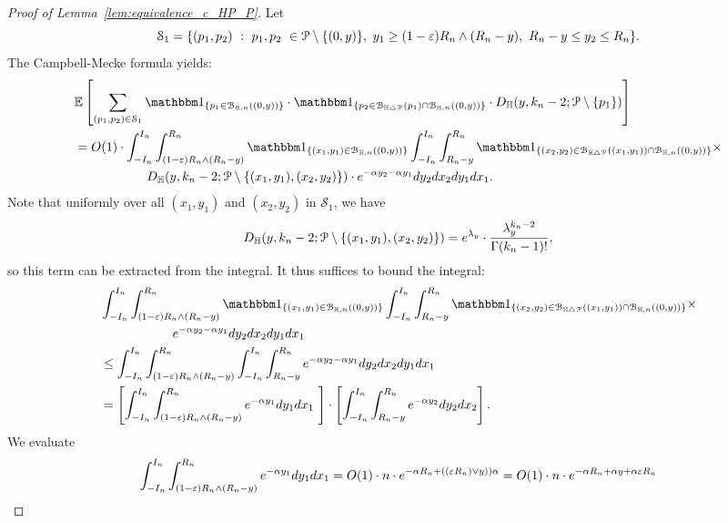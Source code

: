 \begin{proof}[Proof of Lemma~\ref{lem:equivalence_c_HP_P}]
Let 
$$\mathcal{S}_1 = \{(p_1, p_2) \ : \  p_1,p_2 \ \in \Pcal \setminus \{(0,y) \}, \ y_1 \geq (1-\eps) R_n \wedge (R_n-y), \ 
R_n -y \leq y_2 \leq R_n \}. $$
The Campbell-Mecke formula yields: 
\begin{equation*}
\begin{split} 
&\Exp { \sum_{(p_1,p_2)  \in \mathcal{S}_1} 
\ind{p_1 \in \BallHyp{(0,y)}} \cdot \ind{p_2 \in \BallSym{p_1} \cap \BallHyp{(0,y)}}
\cdot D_\H (y,k_n-2;\Pcal \setminus \{ p_1\})} \\
& 
=O(1) \cdot \int_{-I_n}^{I_n} \int_{(1-\eps) R_n \wedge (R_n-y)}^{R_n} \ind{(x_1,y_1) \in \BallHyp{(0,y)}}
\int_{-I_n}^{I_n} \int_{R_n - y}^{R_n} 
\ind{(x_2,y_2) \in \BallSym{(x_1,y_1)} \cap \BallHyp{(0,y)}} \times \\ 
& \hspace{2cm}  D_\H (y,k_n-2;\Pcal \setminus \{ (x_1,y_1), (x_2,y_2)\}) \cdot
e^{-\alpha y_2 - \alpha y_1} dy_2 dx_2 dy_1 dx_1.
\end{split}
\end{equation*}
Note that uniformly over all $(x_1,y_1)$ and $(x_2,y_2)$ in $\mathcal{S}_1$, we have 
$$ D_{\mathbb{H}} (y,k_n-2;{\mathcal P} \setminus \{ (x_1,y_1), (x_2,y_2)\})   = e^{\lambda_y} \cdot \frac{\lambda_y^{k_n-2}}{\Gamma (k_n-1)!}, $$
so this term can be extracted from the integral. 
It thus suffices to bound the integral: 
\begin{equation*}
\begin{split}
&\int_{-I_n}^{I_n} \int_{(1-\eps) R_n \wedge (R_n-y)}^{R_n} \ind{(x_1,y_1) \in \BallHyp{(0,y)}}
\int_{-I_n}^{I_n} \int_{R_n - y}^{R_n } 
\ind{(x_2,y_2) \in \BallSym{(x_1,y_1)} \cap \BallHyp{(0,y)}} \times \\ 
& \hspace{2cm}  e^{-\alpha y_2 - \alpha y_1} dy_2 dx_2 dy_1 dx_1 \\
&\leq \int_{-I_n}^{I_n} \int_{(1-\eps) R_n \wedge (R_n-y)}^{R_n} 
\int_{-I_n}^{I_n} \int_{R_n - y}^{R_n}  e^{-\alpha y_2 - \alpha y_1} dy_2 dx_2 dy_1 dx_1\\
&= \left[ \int_{-I_n}^{I_n} \int_{(1-\eps) R_n \wedge (R_n-y)}^{R_n} 
e^{- \alpha y_1} dy_1 dx_1\
\right] \cdot 
\left[\int_{-I_n}^{I_n} \int_{R_n - y}^{R_n}  e^{-\alpha y_2} dy_2 dx_2 \right].
\end{split}
\end{equation*}
We evaluate
$$  \int_{-I_n}^{I_n} \int_{(1-\varepsilon) R_n \wedge (R_n-y)}^{R_n} 
e^{- \alpha y_1} dy_1 dx_1= O(1) \cdot n \cdot e^{-\alpha R_n + ((\varepsilon R_n) \vee y))\alpha}
=O(1) \cdot n \cdot e^{-\alpha R_n + \alpha y + \alpha \varepsilon R_n }
$$
\end{proof}
